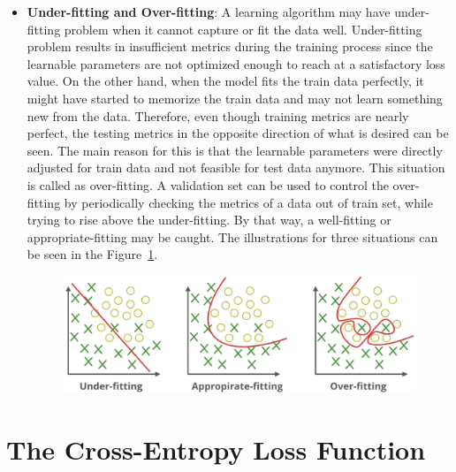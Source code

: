 \begin{itemize}
\item \textbf{Under-fitting and Over-fitting}: A learning algorithm may have under-fitting problem when it cannot capture or fit the data well. Under-fitting problem results in insufficient metrics during the training process since the learnable parameters are not optimized enough to reach at a satisfactory loss value. On the other hand, when the model fits the train data perfectly, it might have started to memorize the train data and may not learn something new from the data. Therefore, even though training metrics are nearly perfect, the testing metrics in the opposite direction of what is desired can be seen. The main reason for this is that the learnable parameters were directly adjusted for train data and not feasible for test data anymore. This situation is called as over-fitting. A validation set can be used to control the over-fitting by periodically checking the metrics of a data out of train set, while trying to rise above the under-fitting. By that way, a well-fitting or appropriate-fitting may be caught. The illustrations for three situations can be seen in the Figure~\ref{fig:underfitting_overfitting}.

\begin{figure}[h]
\centering
\includegraphics[width=1\linewidth]{fig/underfitting_overfitting.png}
\vspace*{1mm}
\label{fig:underfitting_overfitting}
\end{figure}

\end{itemize}

\section{The Cross-Entropy Loss Function}\label{sec:CH3_cross_entropy}

